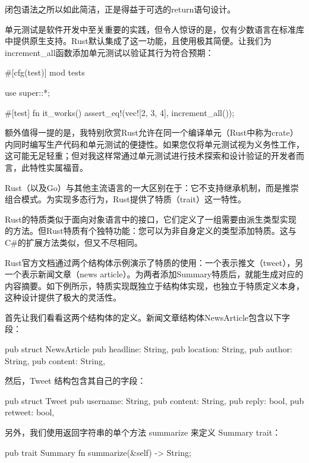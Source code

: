 闭包语法之所以如此简洁，正是得益于可选的return语句设计。


单元测试是软件开发中至关重要的实践，但令人惊讶的是，仅有少数语言在标准库中提供原生支持。Rust默认集成了这一功能，且使用极其简便。让我们为increment\_all函数添加单元测试以验证其行为符合预期：

\begin{rust}
#[cfg(test)]
mod tests {
  use super::*;

  #[test]
  fn it_works() {
    assert_eq!(vec![2, 3, 4], increment_all());
  }
}
\end{rust}

额外值得一提的是，我特别欣赏Rust允许在同一个编译单元（Rust中称为crate）内同时编写生产代码和单元测试的便捷性。如果您仅将单元测试视为义务性工作，这可能无足轻重；但对我这样常通过单元测试进行技术探索和设计验证的开发者而言，此特性实属福音。


Rust（以及Go）与其他主流语言的一大区别在于：它不支持继承机制，而是推崇组合模式。为实现多态行为，Rust提供了特质（trait）这一特性。

Rust的特质类似于面向对象语言中的接口，它们定义了一组需要由派生类型实现的方法。但Rust特质有个独特功能：您可以为非自身定义的类型添加特质。这与C\#的扩展方法类似，但又不尽相同。

Rust官方文档通过两个结构体示例演示了特质的使用：一个表示推文（tweet），另一个表示新闻文章（news article）。为两者添加Summary特质后，就能生成对应的内容摘要。如下例所示，特质实现既独立于结构体实现，也独立于特质定义本身，这种设计提供了极大的灵活性。

首先让我们看看这两个结构体的定义。新闻文章结构体NewsArticle包含以下字段：

\begin{rust}
pub struct NewsArticle {
  pub headline: String,
  pub location: String,
  pub author: String,
  pub content: String,
}
\end{rust}

然后，Tweet 结构包含其自己的字段：

\begin{rust}
pub struct Tweet {
  pub username: String,
  pub content: String,
  pub reply: bool,
  pub retweet: bool,
}
\end{rust}

另外，我们使用返回字符串的单个方法 summarize 来定义 Summary trait：

\begin{rust}
pub trait Summary {
  fn summarize(&self) -> String;
}
\end{rust}


